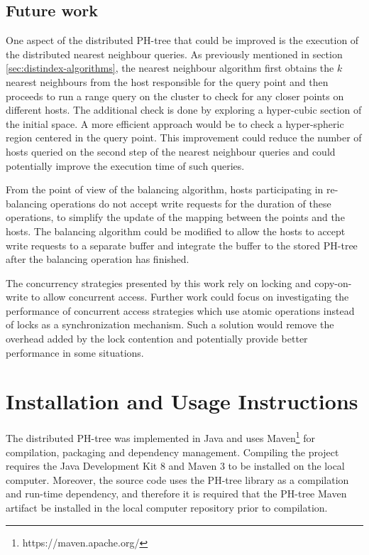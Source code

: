 \documentclass[11pt,a4paper]{globis-book}
\begin{document}
\section{Future work}
\label{sec:conclusions-future-work}

One aspect of the distributed PH-tree that could be improved is the execution of the distributed nearest neighbour queries. As previously mentioned in section \ref{sec:distindex-algorithms}, the nearest neighbour algorithm first obtains the $k$ nearest neighbours from the host responsible for the query point and then proceeds to run a range query on the cluster to check for any closer points on different hosts. The additional check is done by exploring a hyper-cubic section of the initial space. A more efficient approach would be to check a hyper-spheric region centered in the query point. This improvement could reduce the number of hosts queried on the second step of the nearest neighbour queries and could potentially improve the execution time of such queries. 

From the point of view of the balancing algorithm, hosts participating in re-balancing operations do not accept write requests for the duration of these operations, to simplify the update of the mapping between the points and the hosts. The balancing algorithm could be modified to allow the hosts to accept write requests to a separate buffer and integrate the buffer to the stored PH-tree after the balancing operation has finished.

The concurrency strategies presented by this work rely on locking and copy-on-write to allow concurrent access. Further work could focus on investigating the performance of concurrent access strategies which use atomic operations instead of locks as a synchronization mechanism. Such a solution would remove the overhead added by the lock contention and potentially provide better performance in some situations.

\appendix
\chapter{Installation and Usage Instructions}

The distributed PH-tree was implemented in Java and uses Maven\footnote{https://maven.apache.org/} for compilation, packaging and dependency management. Compiling the project requires the Java Development Kit 8 and Maven 3 to be installed on the local computer. Moreover, the source code uses the PH-tree library as a compilation and run-time dependency, and therefore it is required that the PH-tree Maven artifact be installed in the local computer repository prior to compilation. 
\end{document}
